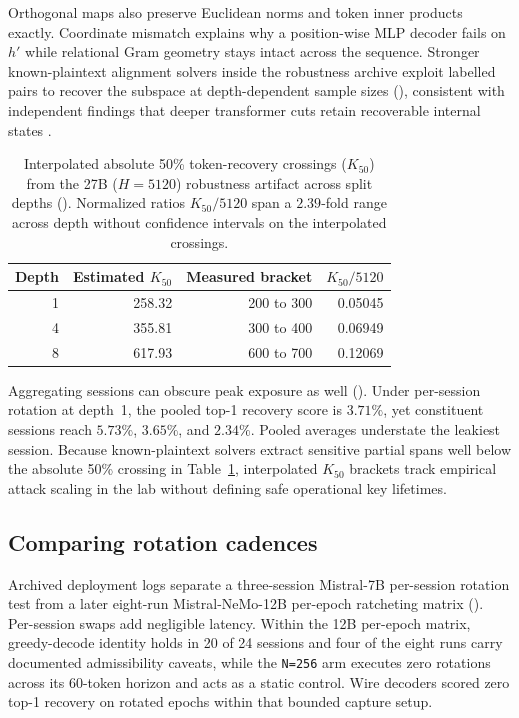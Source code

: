 Orthogonal maps also preserve Euclidean norms and token inner products
exactly. Coordinate mismatch explains why a position-wise MLP decoder fails
on $h'$ while relational Gram geometry stays intact across the sequence.
Stronger known-plaintext alignment solvers inside the robustness archive
exploit labelled pairs to recover the subspace at depth-dependent sample
sizes (), consistent with independent findings that deeper
transformer cuts retain recoverable internal states
\cite{depth2025,actinv2026,bettisplit2026}.

\begin{table}[t]
\centering\small
\begin{tabular}{@{}rrrr@{}}
\toprule
Depth & Estimated $K_{50}$ & Measured bracket & $K_{50}/5120$ \\
\midrule
1 & 258.32 & 200 to 300 & 0.05045 \\
4 & 355.81 & 300 to 400 & 0.06949 \\
8 & 617.93 & 600 to 700 & 0.12069 \\
\bottomrule
\end{tabular}
\caption{Interpolated absolute 50\% token-recovery crossings ($K_{50}$)
from the 27B ($H=5120$) robustness artifact across split depths
(). Normalized ratios $K_{50}/5120$ span a $2.39$-fold range
across depth without confidence intervals on the interpolated crossings.}
\label{tab:k50}
\end{table}

Aggregating sessions can obscure peak exposure as well ().
Under per-session rotation at depth~1, the pooled top-1 recovery score is
$3.71\%$, yet constituent sessions reach $5.73\%$, $3.65\%$, and $2.34\%$.
Pooled averages understate the leakiest session. Because known-plaintext
solvers extract sensitive partial spans well below the absolute 50\%
crossing in Table~\ref{tab:k50}, interpolated $K_{50}$ brackets track
empirical attack scaling in the lab without defining safe operational key
lifetimes.

\subsection{Comparing rotation cadences}

Archived deployment logs separate a three-session Mistral-7B per-session
rotation test from a later eight-run Mistral-NeMo-12B per-epoch ratcheting
matrix (). Per-session swaps add negligible latency. Within
the 12B per-epoch matrix, greedy-decode identity holds in 20 of 24 sessions
and four of the eight runs carry documented admissibility caveats, while
the \texttt{N=256} arm executes zero rotations across its 60-token horizon
and acts as a static control. Wire decoders scored zero top-1 recovery on
rotated epochs within that bounded capture setup.

